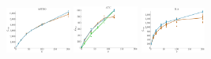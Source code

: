 \documentclass[a4paper]{report}
\newcommand{\wratio}{0.16}
\begin{document}
\includegraphics[width=\wratio\textwidth]{maxcut/ASTRO/fs_astro}\hfill
\includegraphics[width=\wratio\textwidth]{maxcut/ATC/fs_atc}\hfill
\includegraphics[width=\wratio\textwidth]{maxcut/B_A/fs_b_a}\hfill
\end{document}
